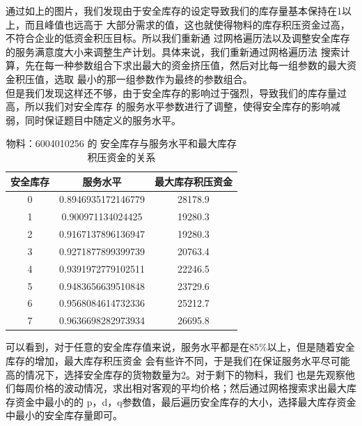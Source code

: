 \documentclass{cumcmthesis}
\begin{document}
        通过如上的图片，我们发现由于安全库存的设定导致我们的库存量基本保持在1以上，而且峰值也远高于
        大部分需求的值，这也就使得物料的库存积压资金过高，不符合企业的低资金积压目标。所以我们重新通
        过网格遍历法以及调整安全库存的服务满意度大小来调整生产计划。具体来说，我们重新通过网格遍历法
        搜索计算，先在每一种参数组合下求出最大的资金挤压值，然后对比每一组参数的最大资金积压值，选取
        最小的那一组参数作为最终的参数组合。\\

        但是我们发现这样还不够，由于安全库存的影响过于强烈，导致我们的库存量过高，所以我们对安全库存
        的服务水平参数进行了调整，使得安全库存的影响减弱，同时保证题目中随定义的服务水平。\\

        \begin{table}[htbp]
            \centering
            \caption{物料：6004010256 的 安全库存与服务水平和最大库存积压资金的关系}
            \label{tab:safety_stock}
            \begin{tabular}{ccc} %
            \toprule
            安全库存 & 服务水平 & 最大库存积压资金 \\
            \midrule
            0 & 0.8946935172146779 & 28178.9 \\
            1 & 0.900971134024425 & 19280.3 \\
            2 & 0.9167137896136947 & 19280.3 \\
            3 & 0.9271877899399739 & 20763.4 \\
            4 & 0.9391972779102511 & 22246.5 \\
            5 & 0.9483656639510848 & 23729.6 \\
            6 & 0.9568084614732336 & 25212.7 \\
            7 & 0.9636698282973934 & 26695.8 \\
            \bottomrule
            \end{tabular}
        \end{table}

        可以看到，对于任意的安全库存值来说，服务水平都是在85\%以上，但是随着安全库存的增加，最大库存积压资金
        会有些许不同，于是我们在保证服务水平尽可能高的情况下，选择安全库存的货物数量为2。对于剩下的物料，我们
        也是先观察他们每周价格的波动情况，求出相对客观的平均价格；然后通过网格搜索求出最大库存资金中最小的的
        p，d，q参数值，最后遍历安全库存的大小，选择最大库存资金中最小的安全库存量即可。\\
\end{document}
